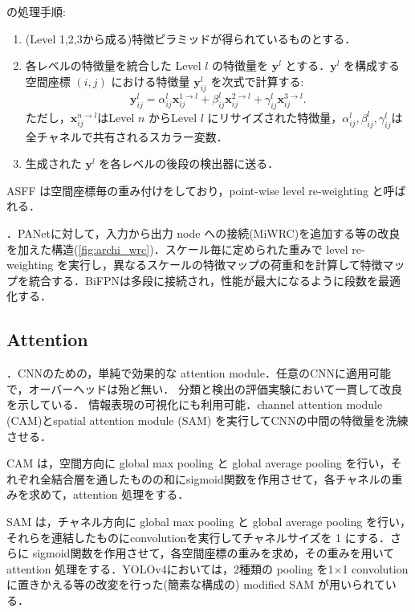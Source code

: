\documentclass[originalpaper,fleqn]{jsaiart}     %
\newcommand{\vect}[1]{\boldsymbol #1}
\begin{document}
 \cite{LHW19}の処理手順:
\newcommand{\yb}[2]{\boldsymbol{y}^{#1}_{#2}}
\newcommand{\xb}[2]{\boldsymbol{x}^{#1}_{#2}}
\begin{enumerate}
    \item (Level 1,2,3から成る)特徴ピラミッドが得られているものとする．
    \item 各レベルの特徴量を統合した Level $l$ の特徴量を $\vect{y}^l$ とする．$\vect{y}^l$ を構成する空間座標 $(i,j)$ における特徴量 $\yb{l}{ij}$ を次式で計算する: $$ \yb{l}{ij} = \alpha^l_{ij}\xb{1{\rightarrow}l}{ij} + \beta^l_{ij}\xb{2{\rightarrow}l}{ij} + \gamma^l_{ij}\xb{3{\rightarrow}l}{ij}. $$ ただし，$\xb{n{\rightarrow}l}{ij}$はLevel $n$ からLevel $l$ にリサイズされた特徴量，$\alpha^l_{ij},\beta^l_{ij},\gamma^l_{ij}$は全チャネルで共有されるスカラー変数．
    \item 生成された $\vect{y}^l$ を各レベルの後段の検出器に送る．
\end{enumerate}
ASFF は空間座標毎の重み付けをしており，point-wise level re-weighting と呼ばれる．

 \cite{TPL20}．PANetに対して，入力から出力 node への接続(MiWRC)を追加する等の改良を加えた構造(\ref{fig:archi_wrc})．スケール毎に定められた重みで level re-weighting を実行し，異なるスケールの特徴マップの荷重和を計算して特徴マップを統合する．BiFPNは多段に接続され，性能が最大になるように段数を最適化する．

\subsection{Attention}
 \cite{WPLK18}．CNNのための，単純で効果的な attention module．任意のCNNに適用可能で，オーバーヘッドは殆ど無い．
分類と検出の評価実験において一貫して改良を示している．
情報表現の可視化にも利用可能．channel attention module (CAM)とspatial attention module (SAM) を実行してCNNの中間の特徴量を洗練させる．

CAM は，空間方向に global max pooling と global average pooling を行い，それぞれ全結合層を通したものの和にsigmoid関数を作用させて，各チャネルの重みを求めて，attention 処理をする．

SAM は，チャネル方向に global max pooling と global average pooling を行い，それらを連結したものにconvolutionを実行してチャネルサイズを 1 にする．さらに sigmoid関数を作用させて，各空間座標の重みを求め，その重みを用いてattention 処理をする．YOLOv4においては，2種類の pooling を1$\times$1 convolution に置きかえる等の改変を行った(簡素な構成の) modified SAM が用いられている．
\end{document}
